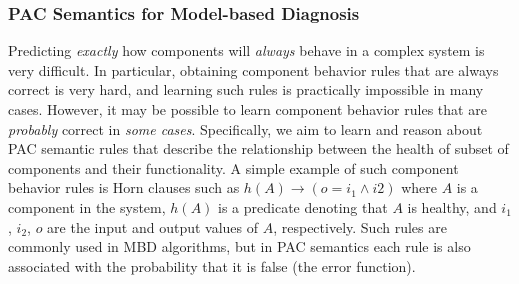 \documentclass[12pt]{article}
\newcommand{\note}[1]{\textbf{\textit{#1}}}
\begin{document}




\subsubsection{PAC Semantics for Model-based Diagnosis}


Predicting {\em exactly} how components will {\em always} behave in a complex system is very difficult. In particular, obtaining component behavior rules that are always correct is very hard, and learning such rules is practically impossible in many cases. However, it may be possible to learn component behavior rules that are {\em probably} correct in {\em some cases}. Specifically, we aim to learn and reason about PAC semantic rules that describe the relationship between 
the health of subset of components and their functionality. 
A simple example of such component behavior rules is Horn clauses such as $h(A)\rightarrow (o = i_1 \wedge i2)$
where $A$ is a component in the system, $h(A)$ is a predicate denoting that $A$ is healthy, and $i_1$, $i_2$, $o$ are the input and output values of $A$, respectively. Such rules are commonly used in MBD algorithms,
but in PAC semantics each rule is also associated with the probability that it is false (the error function). 
\end{document}
